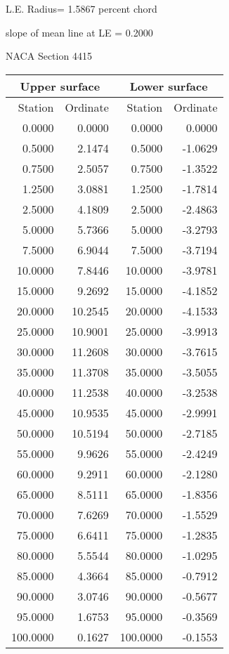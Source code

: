 \documentclass[11pt]{book}
\begin{document}
L.E. Radius=  1.5867 percent chord


 slope of mean line at LE =  0.2000
 \newpage
  \label{s4415}
 \begin{Large}
 NACA Section 4415
 \end{Large}
  
 \vspace{8mm}
 \begin{tabular}{|r|r|r|r|} \hline 
 \multicolumn{2}{|c|}{Upper surface} & \multicolumn{2}{|c|}{Lower surface} \\
 \hline
 Station & Ordinate & Station & Ordinate \\
 \hline
0.0000 & 0.0000 & 0.0000 & 0.0000 \\
0.5000 & 2.1474 & 0.5000 & -1.0629 \\
0.7500 & 2.5057 & 0.7500 & -1.3522 \\
1.2500 & 3.0881 & 1.2500 & -1.7814 \\
2.5000 & 4.1809 & 2.5000 & -2.4863 \\
5.0000 & 5.7366 & 5.0000 & -3.2793 \\
7.5000 & 6.9044 & 7.5000 & -3.7194 \\
10.0000 & 7.8446 & 10.0000 & -3.9781 \\
15.0000 & 9.2692 & 15.0000 & -4.1852 \\
20.0000 & 10.2545 & 20.0000 & -4.1533 \\
25.0000 & 10.9001 & 25.0000 & -3.9913 \\
30.0000 & 11.2608 & 30.0000 & -3.7615 \\
35.0000 & 11.3708 & 35.0000 & -3.5055 \\
40.0000 & 11.2538 & 40.0000 & -3.2538 \\
45.0000 & 10.9535 & 45.0000 & -2.9991 \\
50.0000 & 10.5194 & 50.0000 & -2.7185 \\
55.0000 & 9.9626 & 55.0000 & -2.4249 \\
60.0000 & 9.2911 & 60.0000 & -2.1280 \\
65.0000 & 8.5111 & 65.0000 & -1.8356 \\
70.0000 & 7.6269 & 70.0000 & -1.5529 \\
75.0000 & 6.6411 & 75.0000 & -1.2835 \\
80.0000 & 5.5544 & 80.0000 & -1.0295 \\
85.0000 & 4.3664 & 85.0000 & -0.7912 \\
90.0000 & 3.0746 & 90.0000 & -0.5677 \\
95.0000 & 1.6753 & 95.0000 & -0.3569 \\
100.0000 & 0.1627 & 100.0000 & -0.1553 \\
 \hline 
 \end{tabular}
\end{document}
